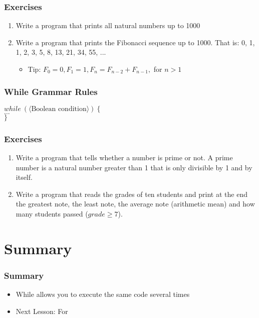 \documentclass{beamer}
\newcommand{\cindent}{\hskip20pt}
\begin{document}
	\begin{frame}
		\frametitle{Exercises}
		\begin{enumerate}
			\item Write a program that prints all natural numbers up to 1000
			\pause
			\item Write a program that prints the Fibonacci sequence up to 1000. That is: 0, 1, 1, 2, 3, 5, 8, 13, 21, 34, 55, ... 
			\pause
			\begin{itemize}
				\item Tip: $F_0 = 0, F_1 = 1, F_n = F_{n-2} + F_{n-1},$ for $n > 1$
			\end{itemize}
		\end{enumerate}
	\end{frame}

	\begin{frame}
		\frametitle{While Grammar Rules}
		$while\ (\langle \text{Boolean condition} \rangle)\ \{$\\
			\cindent $...$\\
		$\}$\\
	\end{frame}

	\begin{frame}
		\frametitle{Exercises}
		\begin{enumerate}
			\item Write a program that tells whether a number is prime or not. A prime number is a natural number greater than 1 that is only divisible by 1 and by itself.
			\pause
			\item Write a program that reads the grades of ten students and print at the end the greatest note, the least note, the average note (arithmetic mean) and how many students passed ($grade \ge 7$).
		\end{enumerate}
	\end{frame}
		
	\section{Summary}
	
	\begin{frame}
		\frametitle{Summary}
		\begin{itemize}
			\item While allows you to execute the same code several times
			\item Next Lesson: For
		\end{itemize}
	\end{frame}
\end{document}
